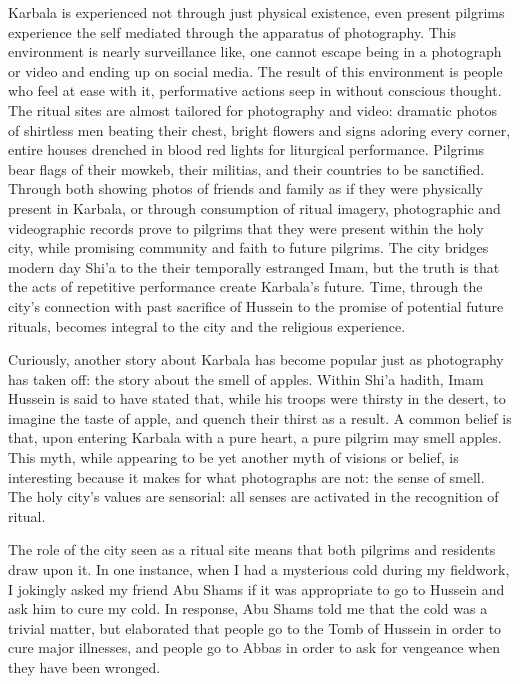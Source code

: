 Karbala is experienced not through just physical existence, even present pilgrims experience the self mediated through the apparatus of photography. This environment is nearly surveillance like, one cannot escape being in a photograph or video and ending up on social media. The result of this environment is people who feel at ease with it, performative actions seep in without conscious thought. The ritual sites are almost tailored for photography and video: dramatic photos of shirtless men beating their chest, bright flowers and signs adoring every corner, entire houses drenched in blood red lights for liturgical performance. Pilgrims bear flags of their mowkeb, their militias, and their countries to be sanctified. Through both showing photos of friends and family as if they were physically present in Karbala, or through consumption of ritual imagery, photographic and videographic records prove to pilgrims that they were present within the holy city, while promising community and faith to future pilgrims. The city bridges modern day Shi'a to the their temporally estranged Imam, but the truth is that the acts of repetitive performance create Karbala's future. Time, through the city's connection with past sacrifice of Hussein to the promise of potential future rituals, becomes integral to the city and the religious experience. 

Curiously, another story about Karbala has become popular just as photography has taken off: the story about the smell of apples. Within Shi'a hadith, Imam Hussein is said to have stated that, while his troops were thirsty in the desert, to imagine the taste of apple, and quench their thirst as a result. A common belief is that, upon entering Karbala with a pure heart, a pure pilgrim may smell apples. This myth, while appearing to be yet another myth of visions or belief, is interesting because it makes for what photographs are not: the sense of smell. The holy city’s values are sensorial: all senses are activated in the recognition of ritual.

The role of the city seen as a ritual site means that both pilgrims and residents draw upon it. In one instance, when I had a mysterious cold during my fieldwork, I jokingly asked my friend Abu Shams if it was appropriate to go to Hussein and ask him to cure my cold. In response, Abu Shams told me that the cold was a trivial matter, but elaborated that people go to the Tomb of Hussein in order to cure major illnesses, and people go to Abbas in order to ask for vengeance when they have been wronged. 

